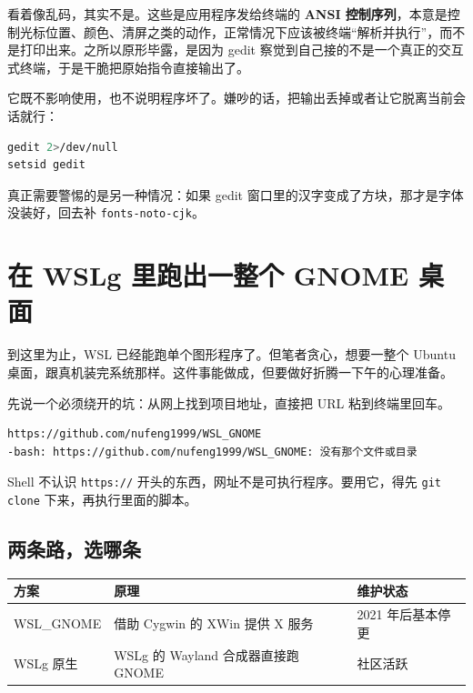 \documentclass[12pt,a4paper]{ctexbook}
\begin{document}
看着像乱码，其实不是。这些是应用程序发给终端的 \textbf{ANSI 控制序列}，本意是控制光标位置、颜色、清屏之类的动作，正常情况下应该被终端``解析并执行''，而不是打印出来。之所以原形毕露，是因为 gedit 察觉到自己接的不是一个真正的交互式终端，于是干脆把原始指令直接输出了。

它既不影响使用，也不说明程序坏了。嫌吵的话，把输出丢掉或者让它脱离当前会话就行：

\begin{lstlisting}[language=bash,title={两种清静的办法}]
gedit 2>/dev/null
setsid gedit
\end{lstlisting}

真正需要警惕的是另一种情况：如果 gedit 窗口里的汉字变成了方块，那才是字体没装好，回去补 \verb|fonts-noto-cjk|。

\section{在 WSLg 里跑出一整个 GNOME 桌面}

到这里为止，WSL 已经能跑单个图形程序了。但笔者贪心，想要一整个 Ubuntu 桌面，跟真机装完系统那样。这件事能做成，但要做好折腾一下午的心理准备。

先说一个必须绕开的坑：从网上找到项目地址，直接把 URL 粘到终端里回车。

\begin{lstlisting}[language=bash,title={把网址当命令敲}]
https://github.com/nufeng1999/WSL_GNOME
-bash: https://github.com/nufeng1999/WSL_GNOME: 没有那个文件或目录
\end{lstlisting}

Shell 不认识 \verb|https://| 开头的东西，网址不是可执行程序。要用它，得先 \verb|git clone| 下来，再执行里面的脚本。

\subsection{两条路，选哪条}

\begin{center}
\small
\begin{tabular}{|l|l|l|}
\hline
\textbf{方案} & \textbf{原理} & \textbf{维护状态} \\
\hline
WSL\_GNOME & 借助 Cygwin 的 XWin 提供 X 服务 & 2021 年后基本停更 \\
WSLg 原生 & WSLg 的 Wayland 合成器直接跑 GNOME & 社区活跃 \\
\hline
\end{tabular}
\end{center}
\end{document}
